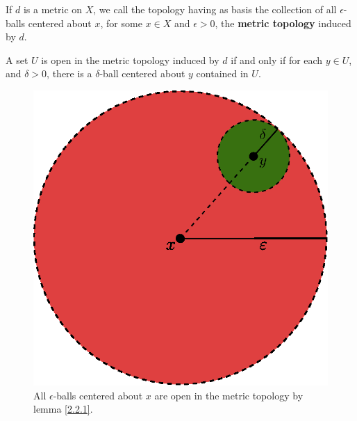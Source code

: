 \begin{definition}
    If $d$ is a metric on  $X$, we call the topology having as basis the
    collection of all $\epsilon$-balls centered about  $x$, for some  $x \in X$
    and $\epsilon>0$, the \textbf {metric topology} induced by $d$.
\end{definition}

\begin{corollary}
    A set $U$ is open in the metric topology induced by  $d$ if and only if for each
    $y \in U$, and $\delta>0$, there is a  $\delta$-ball centered about $y$
    contained in  $U$.
\end{corollary}

\begin{figure}[h]
    \centering
    \includegraphics[scale = 0.5]{Figures/chapter2/open_balls.eps}
    \caption{All $\epsilon$-balls centered about  $x$ are open in the metric topology by lemma
    \ref{2.2.1}.}
    \label{fig2.1}
\end{figure}

